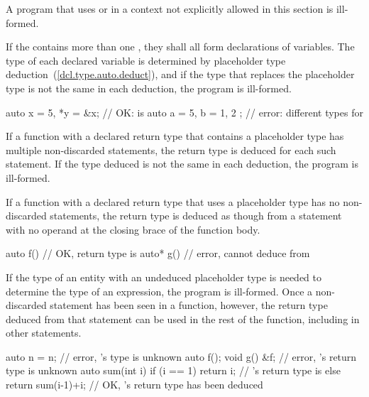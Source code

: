 \pnum
A program that uses  or  in a context not
explicitly allowed in this section is ill-formed.

\pnum
If the  contains more than one
, they shall all form declarations of
variables. The type of each declared variable is determined
by placeholder type deduction~(\ref{dcl.type.auto.deduct}),
and if the type that replaces the placeholder type is not the
same in each deduction, the program is ill-formed.

\begin{example}
\begin{codeblock}
auto x = 5, *y = &x;        // OK:  is 
auto a = 5, b = { 1, 2 };   // error: different types for 
\end{codeblock}
\end{example}%

\pnum
If a function with a declared return type that contains a placeholder type has
multiple non-discarded  statements, the return type is deduced for each
such  statement. If the type deduced is not the same in each
deduction, the program is ill-formed.

\pnum
If a function with a declared return type that uses a placeholder type has no
non-discarded  statements, the return type is deduced as though from a
 statement with no operand at the closing brace of the function
body.
\begin{example}
\begin{codeblock}
auto  f() { } // OK, return type is 
auto* g() { } // error, cannot deduce  from 
\end{codeblock}
\end{example}

\pnum
If the type of an entity with an undeduced placeholder type is needed to
determine the type of an expression, the program is ill-formed. Once a
non-discarded  statement has been seen in a function, however, the return type deduced
from that statement can be used in the rest of the function, including in other
 statements.
\begin{example}
\begin{codeblock}
auto n = n;            // error, 's type is unknown
auto f();
void g() { &f; }       // error, 's return type is unknown
auto sum(int i) {
  if (i == 1)
    return i;          // 's return type is 
  else
    return sum(i-1)+i; // OK, 's return type has been deduced
}
\end{codeblock}
\end{example}

